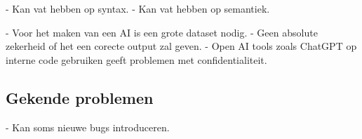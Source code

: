 - Kan vat hebben op syntax.
- Kan vat hebben op semantiek.


- Voor het maken van een AI is een grote dataset nodig.
- Geen absolute zekerheid of het een corecte output zal geven.
- Open AI tools zoals ChatGPT op interne code gebruiken geeft problemen met confidentialiteit.

\subsection{Gekende problemen}
\label{ch:stand-van-zaken:refactoring:known-problems}


- Kan soms nieuwe bugs introduceren.









